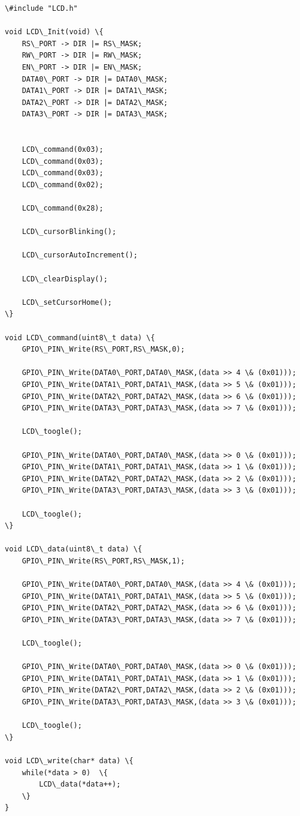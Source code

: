 \documentclass{article}
\begin{document}
\begin{lstlisting}
\#include "LCD.h"

void LCD\_Init(void) \{
	RS\_PORT -> DIR |= RS\_MASK;
	RW\_PORT -> DIR |= RW\_MASK;
	EN\_PORT -> DIR |= EN\_MASK;
	DATA0\_PORT -> DIR |= DATA0\_MASK;
	DATA1\_PORT -> DIR |= DATA1\_MASK;
	DATA2\_PORT -> DIR |= DATA2\_MASK;
	DATA3\_PORT -> DIR |= DATA3\_MASK;


	LCD\_command(0x03);
	LCD\_command(0x03);
	LCD\_command(0x03);
	LCD\_command(0x02);

	LCD\_command(0x28);

	LCD\_cursorBlinking();

	LCD\_cursorAutoIncrement();

	LCD\_clearDisplay();

	LCD\_setCursorHome();
\}

void LCD\_command(uint8\_t data) \{
	GPIO\_PIN\_Write(RS\_PORT,RS\_MASK,0);

	GPIO\_PIN\_Write(DATA0\_PORT,DATA0\_MASK,(data >> 4 \& (0x01)));
	GPIO\_PIN\_Write(DATA1\_PORT,DATA1\_MASK,(data >> 5 \& (0x01)));
	GPIO\_PIN\_Write(DATA2\_PORT,DATA2\_MASK,(data >> 6 \& (0x01)));
	GPIO\_PIN\_Write(DATA3\_PORT,DATA3\_MASK,(data >> 7 \& (0x01)));

	LCD\_toogle();

	GPIO\_PIN\_Write(DATA0\_PORT,DATA0\_MASK,(data >> 0 \& (0x01)));
	GPIO\_PIN\_Write(DATA1\_PORT,DATA1\_MASK,(data >> 1 \& (0x01)));
	GPIO\_PIN\_Write(DATA2\_PORT,DATA2\_MASK,(data >> 2 \& (0x01)));
	GPIO\_PIN\_Write(DATA3\_PORT,DATA3\_MASK,(data >> 3 \& (0x01)));

	LCD\_toogle();
\}

void LCD\_data(uint8\_t data) \{
	GPIO\_PIN\_Write(RS\_PORT,RS\_MASK,1);

	GPIO\_PIN\_Write(DATA0\_PORT,DATA0\_MASK,(data >> 4 \& (0x01)));
	GPIO\_PIN\_Write(DATA1\_PORT,DATA1\_MASK,(data >> 5 \& (0x01)));
	GPIO\_PIN\_Write(DATA2\_PORT,DATA2\_MASK,(data >> 6 \& (0x01)));
	GPIO\_PIN\_Write(DATA3\_PORT,DATA3\_MASK,(data >> 7 \& (0x01)));

	LCD\_toogle();

	GPIO\_PIN\_Write(DATA0\_PORT,DATA0\_MASK,(data >> 0 \& (0x01)));
	GPIO\_PIN\_Write(DATA1\_PORT,DATA1\_MASK,(data >> 1 \& (0x01)));
	GPIO\_PIN\_Write(DATA2\_PORT,DATA2\_MASK,(data >> 2 \& (0x01)));
	GPIO\_PIN\_Write(DATA3\_PORT,DATA3\_MASK,(data >> 3 \& (0x01)));

	LCD\_toogle();
\}

void LCD\_write(char* data) \{
	while(*data > 0)  \{
		LCD\_data(*data++);
	\}
}


\end{lstlisting}
\end{document}
